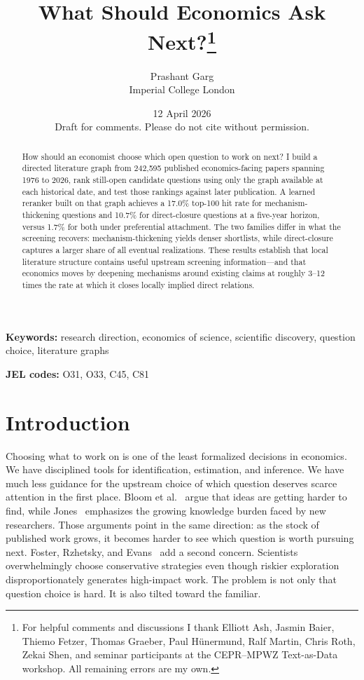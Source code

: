 \documentclass[11pt]{article}
\title{\textbf{What Should Economics Ask Next?}\thanks{For helpful comments and discussions I thank Elliott Ash, Jasmin Baier, Thiemo Fetzer, Thomas Graeber, Paul H\"unermund, Ralf Martin, Chris Roth, Zekai Shen, and seminar participants at the CEPR--MPWZ Text-as-Data workshop. All remaining errors are my own.}}
\author{Prashant Garg\\[0.2em]\normalsize Imperial College London}
\date{12 April 2026\\[0.3em]\normalsize Draft for comments. Please do not cite without permission.}
\begin{document}
\maketitle
\onehalfspacing

\begin{abstract}
How should an economist choose which open question to work on next? I build a directed literature graph from 242{,}595 published economics-facing papers spanning 1976 to 2026, rank still-open candidate questions using only the graph available at each historical date, and test those rankings against later publication. A learned reranker built on that graph achieves a 17.0\% top-100 hit rate for mechanism-thickening questions and 10.7\% for direct-closure questions at a five-year horizon, versus 1.7\% for both under preferential attachment. The two families differ in what the screening recovers: mechanism-thickening yields denser shortlists, while direct-closure captures a larger share of all eventual realizations. These results establish that local literature structure contains useful upstream screening information---and that economics moves by deepening mechanisms around existing claims at roughly 3--12 times the rate at which it closes locally implied direct relations.
\end{abstract}

\textbf{Keywords:} research direction, economics of science, scientific discovery, question choice, literature graphs

\textbf{JEL codes:} O31, O33, C45, C81

\section{Introduction}

Choosing what to work on is one of the least formalized decisions in economics. We have disciplined tools for identification, estimation, and inference. We have much less guidance for the upstream choice of which question deserves scarce attention in the first place. Bloom et al.~\citeyearpar{bloom2020ideas} argue that ideas are getting harder to find, while Jones~\citeyearpar{jones2009burden} emphasizes the growing knowledge burden faced by new researchers. Those arguments point in the same direction: as the stock of published work grows, it becomes harder to see which question is worth pursuing next. Foster, Rzhetsky, and Evans~\citeyearpar{foster2015tradition} add a second concern. Scientists overwhelmingly choose conservative strategies even though riskier exploration disproportionately generates high-impact work. The problem is not only that question choice is hard. It is also tilted toward the familiar.
\end{document}
